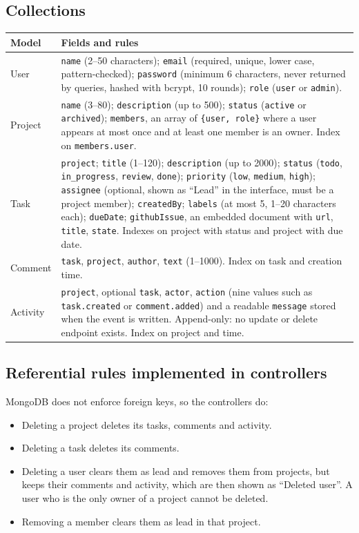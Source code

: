 \documentclass[11pt,a4paper]{article}
\newcommand{\code}[1]{\texttt{#1}}
\begin{document}
\subsection{Collections}
\begin{longtable}{@{}p{2.2cm}p{13.3cm}@{}}
\toprule
\textbf{Model} & \textbf{Fields and rules}\\
\midrule
\endhead
User & \code{name} (2--50 characters); \code{email} (required, unique, lower case, pattern-checked); \code{password} (minimum 6 characters, never returned by queries, hashed with bcrypt, 10 rounds); \code{role} (\code{user} or \code{admin}).\\
Project & \code{name} (3--80); \code{description} (up to 500); \code{status} (\code{active} or \code{archived}); \code{members}, an array of \code{\{user, role\}} where a user appears at most once and at least one member is an owner. Index on \code{members.user}.\\
Task & \code{project}; \code{title} (1--120); \code{description} (up to 2000); \code{status} (\code{todo}, \code{in\_progress}, \code{review}, \code{done}); \code{priority} (\code{low}, \code{medium}, \code{high}); \code{assignee} (optional, shown as ``Lead'' in the interface, must be a project member); \code{createdBy}; \code{labels} (at most 5, 1--20 characters each); \code{dueDate}; \code{githubIssue}, an embedded document with \code{url}, \code{title}, \code{state}. Indexes on project with status and project with due date.\\
Comment & \code{task}, \code{project}, \code{author}, \code{text} (1--1000). Index on task and creation time.\\
Activity & \code{project}, optional \code{task}, \code{actor}, \code{action} (nine values such as \code{task.created} or \code{comment.added}) and a readable \code{message} stored when the event is written. Append-only: no update or delete endpoint exists. Index on project and time.\\
\bottomrule
\end{longtable}

\subsection{Referential rules implemented in controllers}
MongoDB does not enforce foreign keys, so the controllers do:
\begin{itemize}
  \item Deleting a project deletes its tasks, comments and activity.
  \item Deleting a task deletes its comments.
  \item Deleting a user clears them as lead and removes them from projects, but keeps their comments and activity, which are then shown as ``Deleted user''. A user who is the only owner of a project cannot be deleted.
  \item Removing a member clears them as lead in that project.
\end{itemize}
\end{document}
